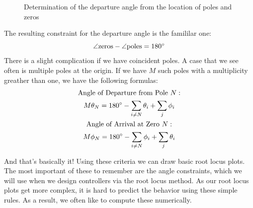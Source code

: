 \begin{figure}[ht]

    \caption{Determination of the departure angle from the location of poles and zeros}
    \label{fig:root locus departure}
\end{figure}
The resulting constraint for the departure angle is the famililar one:
$$\angle\text{zeros}-\angle\text{poles}=180\degree$$
There is a slight complication if we have coincident poles. A case that we see often is multiple poles at the origin. If we have $M$ such poles with a multiplicity greather than one, we have the following formulas:
\begin{gather}
\text{Angle of Departure from Pole } N:\\
M\theta_N=180\degree -\sum_{i\ne N}\theta_i+\sum_j\phi_i\\
\text{Angle of Arrival at Zero } N:\\
M\phi_N=180\degree -\sum_{i\ne N}\phi_i+\sum_j\theta_i
\end{gather}

And that's basically it! Using these criteria we can draw basic root locus plots. The most important of these to remember are the angle constraints, which we will use when we design controllers via the root locus method. As our root locus plots get more complex, it is hard to predict the behavior using these simple rules. As a result, we often like to compute these numerically.

